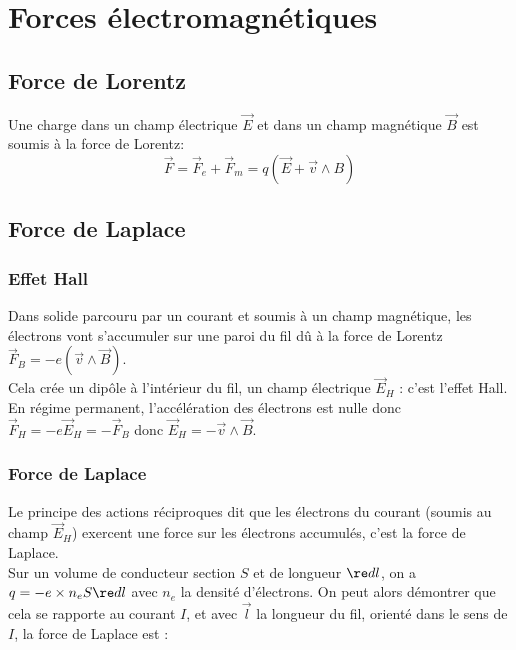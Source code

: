 \documentclass[13pt, twoside, a4paper, french]{report}
\begin{document}
\chapter{Forces électromagnétiques}
    
    
    \section{Force de Lorentz}
    
        Une charge dans un champ électrique $\vec E$ et dans un champ magnétique $\vec B$ est soumis à la force de Lorentz:\\
        
        \[\vec F = \vec F_e + \vec F_m = q (\vec E + \vec v \wedge B)\]
    
    
    \section{Force de Laplace}
        
        \subsection{Effet Hall}
            
            Dans solide parcouru par un courant et soumis à un champ magnétique, les électrons vont s'accumuler sur une paroi du fil dû à la force de Lorentz $\vec F_B = -e (\vec v \wedge \vec B)$.\\
            
            Cela crée un dipôle à l'intérieur du fil, un champ électrique $\vec E_H$ : c'est l'effet Hall.\\
            En régime permanent, l'accélération des électrons est nulle donc $\vec F_H = -e \vec E_H = - \vec F_B$ donc $\vec E_H = - \vec v \wedge \vec B$.\\
        
        \subsection{Force de Laplace}
            
            Le principe des actions réciproques dit que les électrons du courant (soumis au champ $\vec E_H$) exercent une force sur les électrons accumulés, c'est la force de Laplace.\\
            
            Sur un volume de conducteur section $S$ et de longueur $\re d l$, on a $q = -e \times n_e S \re d l$ avec $n_e$ la densité d'électrons. On peut alors démontrer que cela se rapporte au courant $I$, et avec $\vec l$ la longueur du fil, orienté dans le sens de $I$, la force de Laplace est :
            
\end{document}
